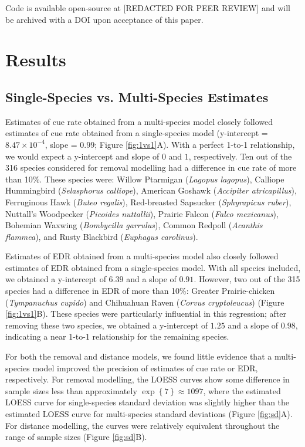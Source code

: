 \documentclass[12pt]{article}
\begin{document}
\par Code is available open-source at [REDACTED FOR PEER REVIEW] and will be archived with a DOI upon acceptance of this paper.


\section{Results}

\subsection{Single-Species vs. Multi-Species Estimates}

\par Estimates of cue rate obtained from a multi-species model closely followed estimates of cue rate obtained from a single-species model (y-intercept = $8.47 \times 10^{-4}$, slope = $0.99$; Figure \ref{fig:1vs1}A).
With a perfect 1-to-1 relationship, we would expect a y-intercept and slope of $0$ and $1$, respectively.
Ten out of the 316 species considered for removal modelling had a difference in cue rate of more than 10\%.
These species were: Willow Ptarmigan (\textit{Lagopus lagopus}), Calliope Hummingbird (\textit{Selasphorus calliope}), American Goshawk (\textit{Accipiter atricapillus}), Ferruginous Hawk (\textit{Buteo regalis}), Red-breasted Sapsucker (\textit{Sphyrapicus ruber}), Nuttall's Woodpecker (\textit{Picoides nuttallii}), Prairie Falcon (\textit{Falco mexicanus}), Bohemian Waxwing (\textit{Bombycilla garrulus}), Common Redpoll (\textit{Acanthis flammea}), and Rusty Blackbird (\textit{Euphagus carolinus}).

\par Estimates of EDR obtained from a multi-species model also closely followed estimates of EDR obtained from a single-species model. 
With all species included, we obtained a y-intercept of $6.39$ and a slope of $0.91$.
However, two out of the 315 species had a difference in EDR of more than 10\%: Greater Prairie-chicken (\textit{Tympanuchus cupido}) and Chihuahuan Raven (\textit{Corvus cryptoleucus}) (Figure \ref{fig:1vs1}B).
These species were particularly influential in this regression; after removing these two species, we obtained a y-intercept of $1.25$ and a slope of $0.98$, indicating a near 1-to-1 relationship for the remaining species.

\par For both the removal and distance models, we found little evidence that a multi-species model improved the precision of estimates of cue rate or EDR, respectively.
For removal modelling, the LOESS curves show some difference in sample sizes less than approximately $\exp\left\{7\right\} \approx 1097$, where the estimated LOESS curve for single-species standard deviation was slightly higher than the estimated LOESS curve for multi-species standard deviations (Figure \ref{fig:sd}A).
For distance modelling, the curves were relatively equivalent throughout the range of sample sizes (Figure \ref{fig:sd}B).
\end{document}
